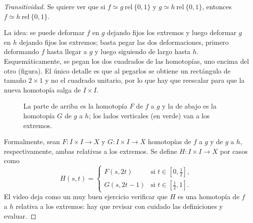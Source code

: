 \documentclass[11pt]{article}
\begin{document}
\begin{proof}[Transitividad]
Se quiere ver que si $f\simeq g\ \mathrm{rel}\ \{0,1\}$ y $g\simeq h\ \mathrm{rel}\ \{0,1\}$, entonces $f\simeq h\ \mathrm{rel}\ \{0,1\}$.

La idea: se puede deformar $f$ en $g$ dejando fijos los extremos y luego deformar $g$ en $h$ dejando fijos los extremos; basta pegar las dos deformaciones, primero deformando $f$ hasta llegar a $g$ y luego siguiendo de largo hasta $h$. Esquemáticamente, se pegan los dos cuadrados de las homotopías, uno encima del otro (figura). El único detalle es que al pegarlos se obtiene un rectángulo de tamaño $2\times1$ y no el cuadrado unitario, por lo que hay que reescalar para que la nueva homotopía salga de $I\times I$.

\begin{figure}[ht]
\centering
{}
\par\smallskip
\begin{minipage}{0.9\textwidth}\small\centering
La parte de arriba es la homotopía $F$ de $f$ a $g$ y la de abajo es la homotopía $G$ de $g$ a $h$; los lados verticales (en verde) van a los extremos.
\end{minipage}
\end{figure}

Formalmente, sean $F\colon I\times I\to X$ y $G\colon I\times I\to X$ homotopías de $f$ a $g$ y de $g$ a $h$, respectivamente, ambas relativas a los extremos. Se define $H\colon I\times I\to X$ por casos como
\[
  H(s,t)=
  \begin{cases}
    F(s,2t) & \text{si } t\in[0,\tfrac12],\\[2pt]
    G(s,2t-1) & \text{si } t\in[\tfrac12,1].
  \end{cases}
\]
El video deja como un muy buen ejercicio verificar que $H$ es una homotopía de $f$ a $h$ relativa a los extremos: hay que revisar con cuidado las definiciones y evaluar.
\end{proof}
\end{document}
